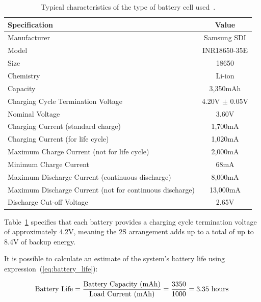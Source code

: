\begingroup
\begin{table}[h]
	\caption{Typical characteristics of the type of battery cell used~\cite{INR18650-35E}.}
	\label{tab:battery2S}
	\centering%
	\begin{tabular}{lc}
        \toprule
        \textbf{Specification} & \textbf{Value} \\
        \midrule
        Manufacturer & Samsung SDI \\
        \midrule
        Model & INR18650-35E \\
        \midrule
		Size & 18650 \\
		\midrule
		Chemistry & Li-ion \\
		\midrule
		Capacity & 3,350mAh \\
        \midrule
		Charging Cycle Termination Voltage & 4.20V $\pm$ 0.05V \\
		\midrule
		Nominal Voltage & 3.60V \\
        \midrule
		Charging Current (standard charge) & 1,700mA\\
		\midrule
		Charging Current (for life cycle) & 1,020mA\\
		\midrule
		Maximum Charge Current (not for life cycle) & 2,000mA \\
		\midrule
		Minimum Charge Current & 68mA \\
		\midrule
		Maximum Discharge Current (continuous discharge) & 8,000mA \\
		\midrule
		Maximum Discharge Current (not for continuous discharge) & 13,000mA \\
		\midrule
		Discharge Cut-off Voltage & 2.65V \\
        \bottomrule
    \end{tabular}
\end{table}
\endgroup

Table~\ref{tab:battery2S} specifies that each battery provides a charging cycle termination voltage of approximately 4.2V, meaning the 2S arrangement adds up to a total of up to 8.4V of backup energy.

It is possible to calculate an estimate of the system's battery life using expression~(\ref{eq:battery_life}):

\begin{equation}\label{eq:battery_life}
    \textrm{Battery Life} = \frac{\textrm{Battery Capacity (mAh)}}{\textrm{Load Current (mAh)}} = \frac{3350}{1000} = 3.35 \textrm{ hours}\,\medskip
\end{equation}


